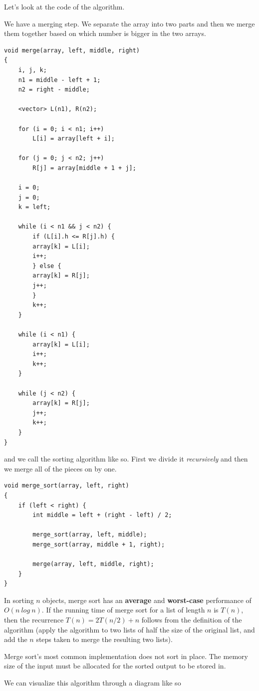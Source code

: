 \documentclass{article}
\begin{document}
Let's look at the code of the algorithm.

We have a merging step. We separate the array into two parts and then we merge them together based on which number is bigger in the two arrays.

\begin{lstlisting}
void merge(array, left, middle, right)
{
	i, j, k;
	n1 = middle - left + 1;
	n2 = right - middle;

	<vector> L(n1), R(n2);

	for (i = 0; i < n1; i++)
	    L[i] = array[left + i];

	for (j = 0; j < n2; j++)
	    R[j] = array[middle + 1 + j];

	i = 0;
	j = 0;
	k = left;

	while (i < n1 && j < n2) {
	    if (L[i].h <= R[j].h) {
		array[k] = L[i];
		i++;
	    } else {
		array[k] = R[j];
		j++;
	    }
	    k++;
	}

	while (i < n1) {
	    array[k] = L[i];
	    i++;
	    k++;
	}

	while (j < n2) {
	    array[k] = R[j];
	    j++;
	    k++;
	}
}
\end{lstlisting}

and we call the sorting algorithm like so. First we divide it \textit{recursively} and then we merge all of the pieces on by one.

\begin{lstlisting}
void merge_sort(array, left, right)
{
    if (left < right) {
        int middle = left + (right - left) / 2;

        merge_sort(array, left, middle);
	    merge_sort(array, middle + 1, right);

        merge(array, left, middle, right);
    }
}
\end{lstlisting}

In sorting $n$ objects, merge sort has an \textbf{average} and \textbf{worst-case} performance of $O(n\ log\ n)$. If the running time of merge sort for a list of length $n$ is $T(n)$, then the recurrence $T(n) = 2T(n/2) + n$ follows from the definition of the algorithm (apply the algorithm to two lists of half the size of the original list, and add the $n$ steps taken to merge the resulting two lists).

Merge sort's most common implementation does not sort in place. The memory size of the input must be allocated for the sorted output to be stored in.

We can visualize this algorithm through a diagram like so
\end{document}
